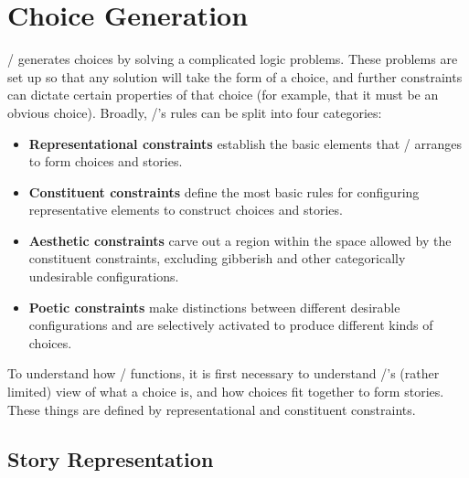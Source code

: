 %


\section{Choice Generation}
\label{sec:dunyazad-choice-generation}

\dunyazad/ generates choices by solving a complicated logic problems.
%
These problems are set up so that any solution will take the form of a choice, and further constraints can dictate certain properties of that choice (for example, that it must be an obvious choice).
%
Broadly, \dunyazad/'s rules can be split into four categories:

\begin{itemize}
\item \textbf{Representational constraints} establish the basic elements that \dunyazad/ arranges to form choices and stories.
\item \textbf{Constituent constraints} define the most basic rules for configuring representative elements to construct choices and stories.
\item \textbf{Aesthetic constraints} carve out a region within the space allowed by the constituent constraints, excluding gibberish and other categorically undesirable configurations.
\item \textbf{Poetic constraints} make distinctions between different desirable configurations and are selectively activated to produce different kinds of choices.
\end{itemize}

To understand how \dunyazad/ functions, it is first necessary to understand \dunyazad/'s (rather limited) view of what a choice is, and how choices fit together to form stories.
%
These things are defined by representational and constituent constraints.


\subsection{Story Representation}


